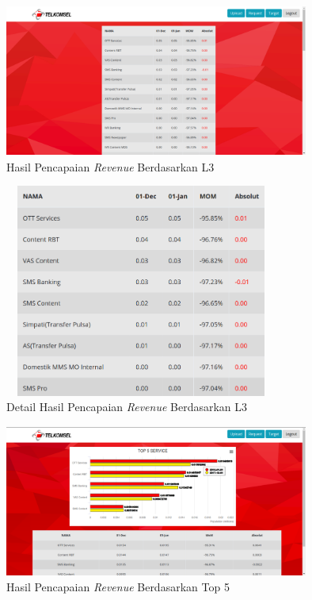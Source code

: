 \begin{figure}[h!]
	\centerline
	{\includegraphics[width=10cm,height=5cm]{bab6/halamanL3.png}}
	\caption{Hasil Pencapaian \textit{Revenue} Berdasarkan L3}
	\label{figure:requestL3}
\end{figure}

\begin{figure}[h!]
	\centerline
	{\includegraphics[width=9cm,height=7cm]{bab6/detailHalamanL3.png}}
	\caption{Detail Hasil Pencapaian \textit{Revenue} Berdasarkan L3}
	\label{figure:detailRequestL3}
\end{figure}

\begin{figure}[ph]
	\centerline
	{\includegraphics[width=10cm,height=5cm]{bab6/halamanT5.png}}
	\caption{Hasil Pencapaian \textit{Revenue} Berdasarkan Top 5}
	\label{figure:requestTop5}
\end{figure}

